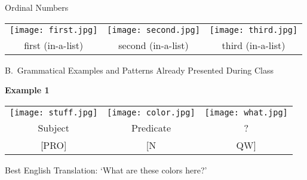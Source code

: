 \documentclass{tufte-book}
\begin{document}
\vspace{0.25cm}\noindent Ordinal Numbers

\begin{table*}[h!]

\begin{tabular}{c c c }
\texttt{[image: first.jpg]}&\texttt{[image: second.jpg]}&\texttt{[image: third.jpg]}\\
\footnotesize first (in-a-list) & \footnotesize second (in-a-list) & \footnotesize third (in-a-list)\\
\end{tabular}
\end{table*}

\vspace{0.25cm}\noindent B.~Grammatical Examples and Patterns Already Presented During Class

\vspace{0.25cm}\noindent \textbf{Example 1}
\begin{table*}[h!]
\begin{tabular}{c | c c}
\texttt{[image: stuff.jpg]}&\texttt{[image: color.jpg]}&\texttt{[image: what.jpg]}\\
\footnotesize Subject & \footnotesize Predicate & \footnotesize ?\\
\footnotesize [PRO] & \footnotesize [N & \footnotesize QW]\\
\end{tabular}
\end{table*}

Best English Translation: `What are these colors here?'
\end{document}
